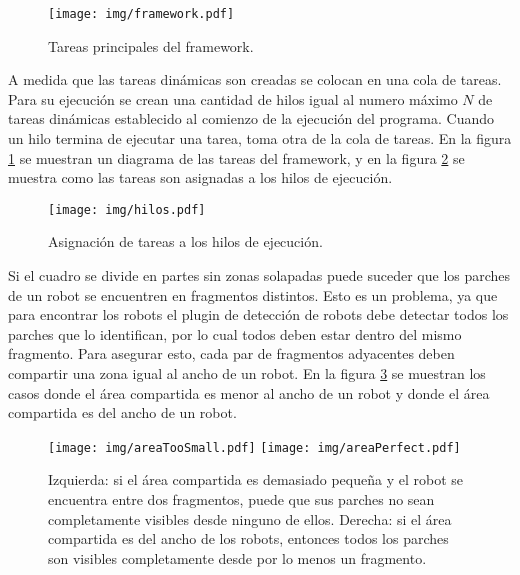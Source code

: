 \begin{figure}[!h]

	\texttt{[image: img/framework.pdf]}

	\caption{Tareas principales del framework.}

	\label{tareasFramework}

\end{figure}

A medida que las tareas dinámicas son creadas se colocan en una cola de tareas.
Para su ejecución se crean una cantidad de hilos igual al numero máximo $N$ de
tareas dinámicas establecido al comienzo de la ejecución del programa. Cuando un
hilo termina de ejecutar una tarea, toma otra de la cola de tareas. En la figura
\ref{tareasFramework} se muestran un diagrama de las tareas del framework, y en
la figura \ref{hilosFramework} se muestra como las tareas son asignadas a los
hilos de ejecución.

\begin{figure}[!h]

	\texttt{[image: img/hilos.pdf]}

	\caption{Asignación de tareas a los hilos de ejecución.}

	\label{hilosFramework}

\end{figure}

Si el cuadro se divide en partes sin zonas solapadas puede suceder que los
parches de un robot se encuentren en fragmentos distintos. Esto es un problema,
ya que para encontrar los robots el plugin de detección de robots debe detectar
todos los parches que lo identifican, por lo cual todos deben estar dentro del
mismo fragmento. Para asegurar esto, cada par de fragmentos adyacentes deben
compartir una zona igual al ancho de un robot. En la figura \ref{areaCompartida}
se muestran los casos donde el área compartida es menor al ancho de un robot y
donde el área compartida es del ancho de un robot.

\begin{figure}[!h]

	\centering
	\texttt{[image: img/areaTooSmall.pdf]}
	\texttt{[image: img/areaPerfect.pdf]}

	\caption{Izquierda: si el área compartida es demasiado pequeña y el
	robot se encuentra entre dos fragmentos, puede que sus parches no sean
	completamente visibles desde ninguno de ellos. Derecha: si el área
	compartida es del ancho de los robots, entonces todos los parches son
	visibles completamente desde por lo menos un fragmento.}

	\label{areaCompartida}

\end{figure}

